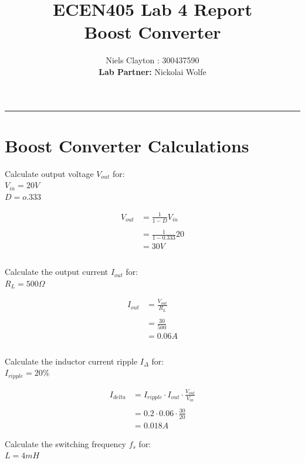 \documentclass[a4paper,11pt]{article}
\begin{document}
\begin{preview}
\title{\LARGE{\textbf{ECEN405 Lab 4 Report\\Boost Converter}}}
\author{Niels Clayton : 300437590\\\textbf{Lab Partner:} Nickolai Wolfe}
\date{}
\maketitle
\hrule

\section{Boost Converter Calculations}

Calculate output voltage $V_{out}$ for:\\
$V_{in} = 20V$\\
$D = o.333$

\begin{align*}
  V_{out}&=\frac{1}{1-D}V_{in}\\\\
  &=\frac{1}{1-0.333}20\\
  &= 30V\\\\
\end{align*}

Calculate the output current $I_{out}$ for:\\
$R_L=500\Omega$

\begin{align*}
  I_{out}&=\frac{V_{out}}{R_{L}}\\\\
  &=\frac{30}{500}\\
  &= 0.06A\\\\
\end{align*}

Calculate the inductor current ripple $I_{\Delta}$ for:\\
$I_{ripple} = 20\%$

\begin{align*}
  I_{delta}&=I_{ripple}\cdot I_{out}\cdot\frac{V_{out}}{V_{in}}\\\\
  &=0.2\cdot 0.06\cdot\frac{30}{20}\\
  &= 0.018A
\end{align*}

Calculate the switching frequency $f_s$ for:\\
$L =4mH$


\end{preview}
\end{document}
